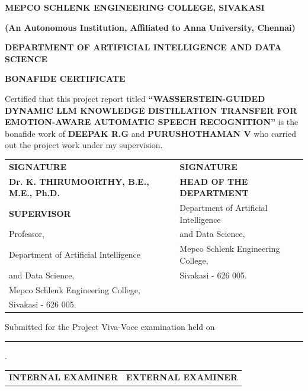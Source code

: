 \documentclass[12pt,a4paper]{report}
\begin{document}
\newpage
\thispagestyle{empty}
\begin{doublespacing}
\begin{center}
    {\fontsize{14pt}{18pt}\selectfont \bfseries MEPCO SCHLENK ENGINEERING COLLEGE, SIVAKASI \par}
    {\fontsize{12pt}{16pt}\selectfont \textbf{(An Autonomous Institution, Affiliated to Anna University, Chennai)} \par}
    \vspace{0.4cm}
    {\fontsize{14pt}{18pt}\selectfont \bfseries DEPARTMENT OF ARTIFICIAL INTELLIGENCE AND DATA SCIENCE \par}
    \vspace{0.8cm}
    {\fontsize{14pt}{18pt}\selectfont \bfseries BONAFIDE CERTIFICATE \par}
\end{center}

\vspace{0.4cm}
\noindent Certified that this project report titled \textbf{``WASSERSTEIN-GUIDED DYNAMIC LLM KNOWLEDGE DISTILLATION TRANSFER FOR EMOTION-AWARE AUTOMATIC SPEECH RECOGNITION''} is the bonafide work of \textbf{DEEPAK R.G} and \textbf{PURUSHOTHAMAN V} who carried out the project work under my supervision.

\vspace{2.5cm}

\noindent
\begin{tabular}{p{7.5cm}p{7.5cm}}
    \textbf{SIGNATURE} & \textbf{SIGNATURE} \\[1.8cm]
    \textbf{Dr. K. THIRUMOORTHY, B.E., M.E., Ph.D.} & \textbf{HEAD OF THE DEPARTMENT} \\
    \textbf{SUPERVISOR} & Department of Artificial Intelligence \\
    Professor, & and Data Science, \\
    Department of Artificial Intelligence & Mepco Schlenk Engineering College, \\
    and Data Science, & Sivakasi - 626 005. \\
    Mepco Schlenk Engineering College, & \\
    Sivakasi - 626 005. & 
\end{tabular}

\vspace{1.0cm}
\noindent Submitted for the Project Viva-Voce examination held on \rule{4.5cm}{0.4pt}.

\vspace{1.5cm}
\noindent
\begin{tabular}{p{7.5cm}p{7.5cm}}
    \textbf{INTERNAL EXAMINER} & \textbf{EXTERNAL EXAMINER}
\end{tabular}
\end{doublespacing}
\end{document}
